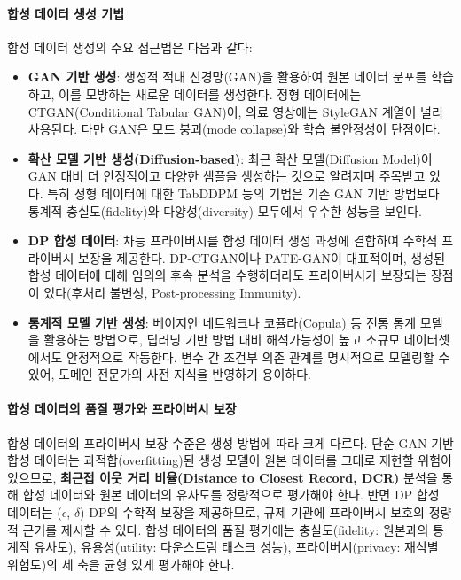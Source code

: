 \paragraph{합성 데이터 생성 기법}

합성 데이터 생성의 주요 접근법은 다음과 같다:

\begin{itemize}
    \item \textbf{GAN 기반 생성}: 생성적 적대 신경망(GAN)을 활용하여 원본 데이터 분포를 학습하고, 이를 모방하는 새로운 데이터를 생성한다. 정형 데이터에는 CTGAN(Conditional Tabular GAN)이, 의료 영상에는 StyleGAN 계열이 널리 사용된다. 다만 GAN은 모드 붕괴(mode collapse)와 학습 불안정성이 단점이다.
    \item \textbf{확산 모델 기반 생성(Diffusion-based)}: 최근 확산 모델(Diffusion Model)이 GAN 대비 더 안정적이고 다양한 샘플을 생성하는 것으로 알려지며 주목받고 있다. 특히 정형 데이터에 대한 TabDDPM 등의 기법은 기존 GAN 기반 방법보다 통계적 충실도(fidelity)와 다양성(diversity) 모두에서 우수한 성능을 보인다.
    \item \textbf{DP 합성 데이터}: 차등 프라이버시를 합성 데이터 생성 과정에 결합하여 수학적 프라이버시 보장을 제공한다. DP-CTGAN이나 PATE-GAN이 대표적이며, 생성된 합성 데이터에 대해 임의의 후속 분석을 수행하더라도 프라이버시가 보장되는 장점이 있다(후처리 불변성, Post-processing Immunity).
    \item \textbf{통계적 모델 기반 생성}: 베이지안 네트워크나 코퓰라(Copula) 등 전통 통계 모델을 활용하는 방법으로, 딥러닝 기반 방법 대비 해석가능성이 높고 소규모 데이터셋에서도 안정적으로 작동한다. 변수 간 조건부 의존 관계를 명시적으로 모델링할 수 있어, 도메인 전문가의 사전 지식을 반영하기 용이하다.
\end{itemize}

\paragraph{합성 데이터의 품질 평가와 프라이버시 보장}

합성 데이터의 프라이버시 보장 수준은 생성 방법에 따라 크게 다르다. 단순 GAN 기반 합성 데이터는 과적합(overfitting)된 생성 모델이 원본 데이터를 그대로 재현할 위험이 있으므로, \textbf{최근접 이웃 거리 비율(Distance to Closest Record, DCR)} 분석을 통해 합성 데이터와 원본 데이터의 유사도를 정량적으로 평가해야 한다. 반면 DP 합성 데이터는 ($\epsilon$, $\delta$)-DP의 수학적 보장을 제공하므로, 규제 기관에 프라이버시 보호의 정량적 근거를 제시할 수 있다. 합성 데이터의 품질 평가에는 충실도(fidelity: 원본과의 통계적 유사도), 유용성(utility: 다운스트림 태스크 성능), 프라이버시(privacy: 재식별 위험도)의 세 축을 균형 있게 평가해야 한다.


